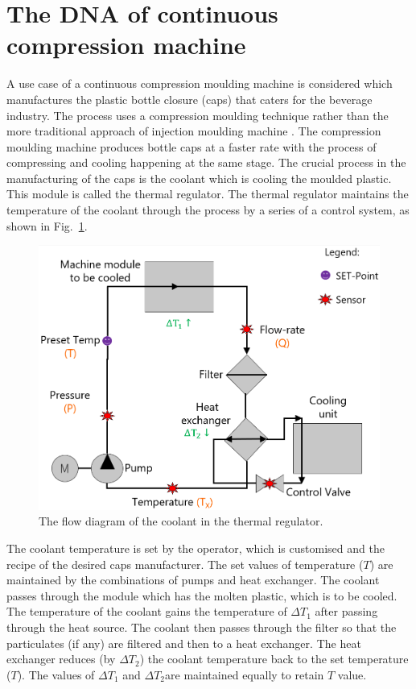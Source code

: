 \documentclass[conference]{IEEEtran}
\begin{document}
\section{The DNA of continuous compression machine}
\label{sec:DNA_CCM}
A use case of a continuous compression moulding machine is considered which manufactures the plastic bottle closure (caps) that caters for the beverage industry. The process uses a compression moulding technique rather than the more traditional approach of injection moulding machine \cite{Liu2020}. The compression moulding \cite{Peltonen1992} machine produces bottle caps at a faster rate with the process of compressing and cooling happening at the same stage. The crucial process in the manufacturing of the caps is the coolant which is cooling the moulded plastic. This module is called the thermal regulator. The thermal regulator maintains the temperature of the coolant through the process by a series of a control system, as shown in Fig.~\ref{fig:TH_schematic}.
\begin{figure}[htbp]
\centerline{\includegraphics[width=\linewidth]{TH_schematic.png}}
\caption{The flow diagram of the coolant in the thermal regulator.}
\label{fig:TH_schematic}
\end{figure}

The coolant temperature is set by the operator, which is customised and the recipe of the desired caps manufacturer. The set values of temperature ($T$) are maintained by the combinations of pumps and heat exchanger. The coolant passes through the module which has the molten plastic, which is to be cooled. The temperature of the coolant gains the temperature of $\Delta T_1$ after passing through the heat source. The coolant then passes through the filter so that the particulates (if any) are filtered and then to a heat exchanger. The heat exchanger reduces (by $\Delta T_2$) the coolant temperature back to the set temperature ($T$). The values of $\Delta T_1$ and $\Delta T_2$are maintained equally to retain $T$ value.
\end{document}
